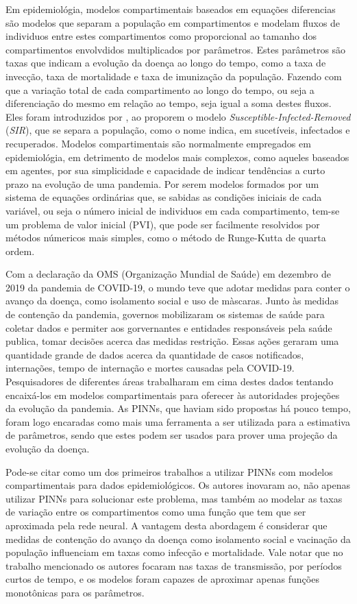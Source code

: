 Em epidemiológia, modelos compartimentais baseados em equações diferencias 
são modelos que separam a população em compartimentos e modelam fluxos de 
individuos entre estes compartimentos como proporcional ao tamanho dos 
compartimentos envolvdidos multiplicados por parâmetros. Estes parâmetros são
taxas que indicam a evolução da doença ao longo do tempo, como a taxa de invecção, 
taxa de mortalidade e taxa de imunização da população. Fazendo com que a variação 
total de cada compartimento ao longo do tempo, ou seja a diferenciação do mesmo 
em relação ao tempo, seja igual a soma destes fluxos.
Eles foram introduzidos por \cite{kermack-mcKendrick:1927}, ao proporem o modelo 
\textit{Susceptible-Infected-Removed} (\textit{SIR}), que se separa a população, 
como o nome indica, em sucetíveis, infectados e recuperados.
Modelos compartimentais são normalmente empregados em epidemiológia, 
em detrimento de modelos mais complexos, como aqueles baseados em agentes, 
por sua simplicidade e capacidade de indicar tendências a curto prazo 
na evolução de uma pandemia. 
Por serem modelos formados por um sistema de equações ordinárias que, se sabidas 
as condições iniciais de cada variável, ou seja o número inicial de individuos
em cada compartimento, tem-se um problema de valor inicial (PVI), que
pode ser facilmente resolvidos por métodos númericos mais simples, 
como o método de Runge-Kutta de quarta ordem.

Com a declaração da OMS (Organização Mundial de Saúde) em dezembro de 2019 da
pandemia de COVID-19, o mundo teve que adotar medidas para conter o avanço da 
doença, como isolamento social e uso de màscaras. Junto às medidas de contenção
da pandemia, governos mobilizaram os sistemas de saúde para coletar dados
e permiter aos gorvernantes e entidades responsáveis pela saúde publica, 
tomar decisões acerca das medidas restrição.  
Essas ações geraram uma quantidade grande de dados acerca da quantidade de casos
notificados, internações, tempo de internação e mortes causadas pela COVID-19.
Pesquisadores de diferentes áreas trabalharam em cima destes dados tentando
encaixá-los em modelos compartimentais para oferecer às autoridades projeções
da evolução da pandemia. As PINNs, que haviam sido propostas há pouco tempo, foram
logo encaradas como mais uma ferramenta a ser utilizada para a estimativa de 
parâmetros, sendo que estes podem ser usados para prover uma projeção da evolução
da doença.   

Pode-se citar \cite{long-etal:21-L2} como um dos primeiros trabalhos a utilizar
PINNs com modelos compartimentais para dados epidemiológicos. Os autores inovaram 
ao, não apenas utilizar PINNs para solucionar este problema, mas também ao modelar 
as taxas de variação entre os compartimentos como uma função que tem que ser
aproximada pela rede neural. A vantagem desta abordagem é considerar que medidas
de contenção do avanço da doença como isolamento social e vacinação da população
influenciam em taxas como infecção e mortalidade. Vale notar que no trabalho
mencionado os autores focaram nas taxas de transmissão, por períodos curtos de tempo,
e os modelos foram capazes de aproximar apenas funções monotônicas para os parâmetros.   

